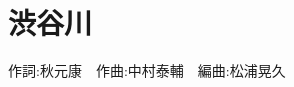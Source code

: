 \section{渋谷川}

\begin{center}
    \scriptsize{
        作詞:秋元康　作曲:中村泰輔　編曲:松浦晃久
    }
\end{center}

\vspace{0.7em}

\begin{Parallel}[c]{0.47\textwidth}{0.47\textwidth}

\ParallelLText{
    \footnotesize{
        
    }
}

\ParallelRText{
    \footnotesize{
        
    }
}

\end{Parallel}
